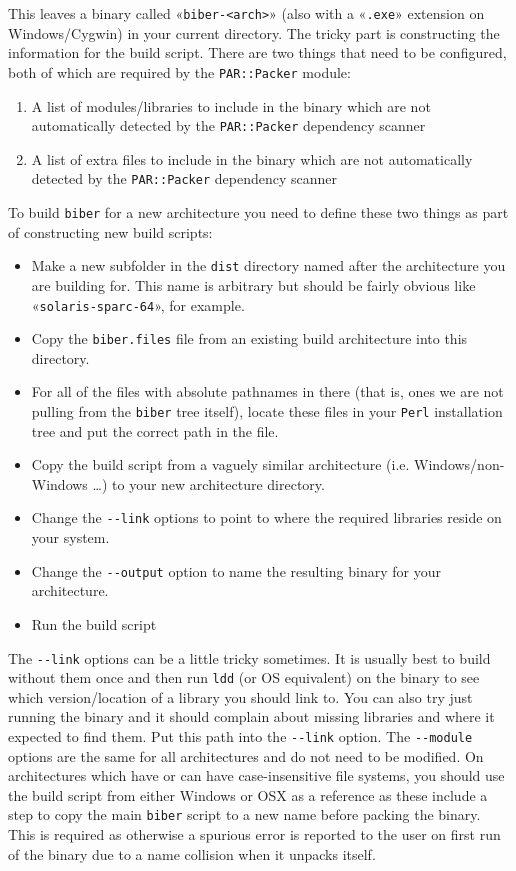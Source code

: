 \documentclass{ltxdockit}
\begin{document}
\noindent This leaves a binary called «\verb+biber-<arch>+» (also with
a «\verb+.exe+» extension on Windows/Cygwin) in your current directory.
The tricky part is constructing the information for the build
script. There are two things that need to be configured, both of
which are required by the \verb+PAR::Packer+ module:

\begin{enumerate}
\item A list of modules/libraries to include in the binary which are not
  automatically detected by the \verb+PAR::Packer+ dependency
  scanner
\item A list of extra files to include in the binary which are not
  automatically detected by the \verb+PAR::Packer+ dependency
  scanner
\end{enumerate}

\noindent To build \verb+biber+ for a new architecture you need to
define these two things as part of constructing new build scripts:

\begin{itemize}
\item Make a new subfolder in the \verb+dist+ directory named after the
  architecture you are building for. This name is arbitrary but should
  be fairly obvious like «\verb+solaris-sparc-64+», for example.
\item Copy the \verb+biber.files+ file from an existing build
  architecture into this directory.
\item For all of the files with absolute pathnames in there (that is,
  ones we are not pulling from the \verb+biber+ tree itself), locate these
  files in your \verb+Perl+ installation tree and put the correct path in the
  file.
\item Copy the build script from a vaguely similar architecture
  (i.e. Windows/non-Windows \ldots) to your new architecture
  directory. 
\item Change the \verb+--link+ options to point to where the required
  libraries reside on your system.
\item Change the \verb+--output+ option to name the resulting binary
  for your architecture.
\item Run the build script
\end{itemize}

\noindent The \verb+--link+ options can be a little tricky
sometimes. It is usually best to build without them once and then run
\verb+ldd+ (or OS equivalent) on the binary to see which
version/location of a library you should link to. You can also try
just running the binary and it should complain about missing libraries
and where it expected to find them. Put this path into the
\verb+--link+ option. The \verb+--module+ options are the same for all
architectures and do not need to be modified.
On architectures which have or can have case-insensitive file systems,
you should use the build script from either Windows or OSX as a reference
as these include a step to copy the main \verb+biber+ script to a new name
before packing the binary. This is required as otherwise a spurious
error is reported to the user on first run of the binary due to a name
collision when it unpacks itself.
\end{document}
